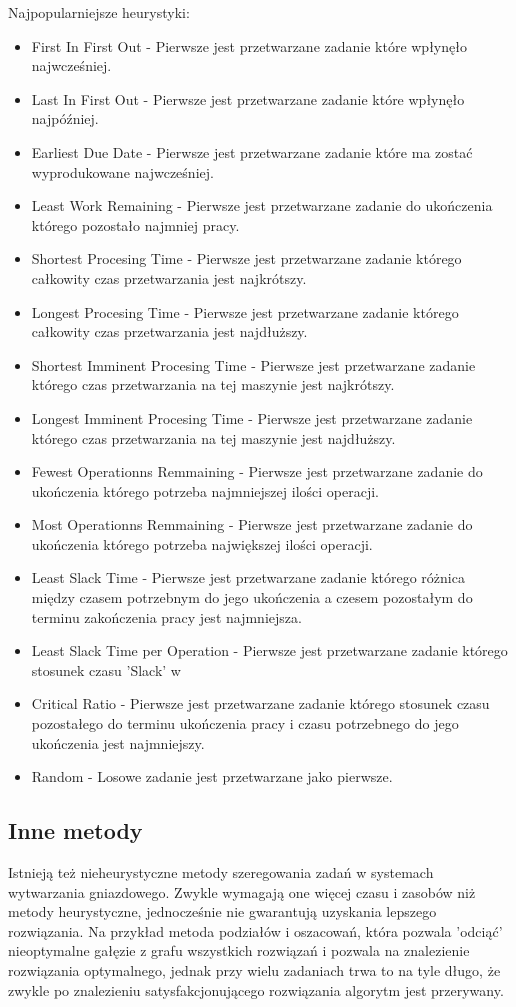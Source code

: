 \documentclass[twoside]{kInzynierka}
\begin{document}
Najpopularniejsze heurystyki:
\begin{itemize}
\item First In First Out - Pierwsze jest przetwarzane zadanie które wpłynęło najwcześniej.
\item Last In First Out - Pierwsze jest przetwarzane zadanie które wpłynęło najpóźniej.
\item Earliest Due Date - Pierwsze jest przetwarzane zadanie które ma zostać wyprodukowane najwcześniej.
\item Least Work Remaining - Pierwsze jest przetwarzane zadanie do ukończenia którego pozostało najmniej pracy.
\item Shortest Procesing Time - Pierwsze jest przetwarzane zadanie którego całkowity czas przetwarzania jest najkrótszy.
\item Longest Procesing Time - Pierwsze jest przetwarzane zadanie którego całkowity czas przetwarzania jest najdłuższy.
\item Shortest Imminent Procesing Time - Pierwsze jest przetwarzane zadanie którego czas przetwarzania na tej maszynie jest najkrótszy.
\item Longest Imminent Procesing Time - Pierwsze jest przetwarzane zadanie którego czas przetwarzania na tej maszynie jest najdłuższy.
\item Fewest Operationns Remmaining - Pierwsze jest przetwarzane zadanie do ukończenia którego potrzeba najmniejszej ilości operacji.
\item Most Operationns Remmaining - Pierwsze jest przetwarzane zadanie do ukończenia którego potrzeba największej ilości operacji.
\item Least Slack Time - Pierwsze jest przetwarzane zadanie którego różnica między czasem potrzebnym do jego ukończenia a czesem pozostałym do terminu zakończenia pracy jest najmniejsza.
\item Least Slack Time per Operation - Pierwsze jest przetwarzane zadanie którego stosunek czasu 'Slack' w
\item Critical Ratio - Pierwsze jest przetwarzane zadanie którego stosunek czasu pozostałego do terminu ukończenia pracy i czasu potrzebnego do jego ukończenia jest najmniejszy.
\item Random - Losowe zadanie jest przetwarzane jako pierwsze.
\end{itemize}

\subsection     {Inne metody}
Istnieją też nieheurystyczne metody szeregowania zadań w systemach wytwarzania gniazdowego. Zwykle wymagają one więcej czasu i zasobów niż metody heurystyczne, jednocześnie nie gwarantują uzyskania lepszego rozwiązania. Na przykład metoda podziałów i oszacowań, która pozwala 'odciąć' nieoptymalne gałęzie z grafu wszystkich rozwiązań i pozwala na znalezienie rozwiązania optymalnego, jednak przy wielu zadaniach trwa to na tyle długo, że zwykle po znalezieniu satysfakcjonującego rozwiązania algorytm jest przerywany.
\end{document}
